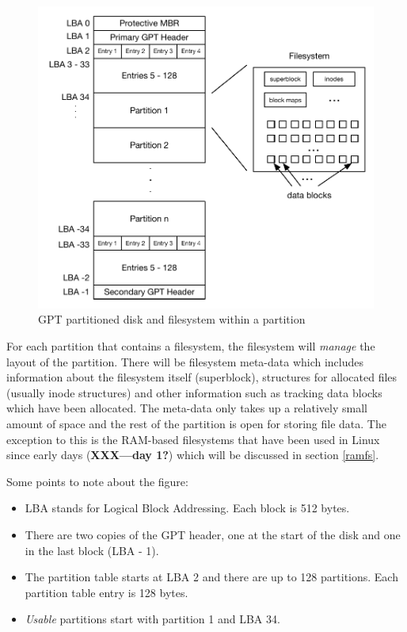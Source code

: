 \begin{figure}
	\includegraphics[scale=0.6]{figures/gpt.pdf}
	\centering
	\caption{GPT partitioned disk and filesystem within a partition}
	\label{fig:gpt}
\end{figure}

For each partition that contains a filesystem, the filesystem will \textit{manage} the layout of the partition. There will be filesystem meta-data which includes information about the filesystem itself (superblock), structures for allocated files (usually inode structures) and other information such as tracking data blocks which have been allocated. The meta-data only takes up a relatively small amount of space and the rest of the partition is open for storing file data. The exception to this is the RAM-based filesystems that have been used in Linux since early days (\textbf{XXX---day 1?}) which will be discussed in section \ref{ramfs}.

Some points to note about the figure:

\begin{itemize}
	\item LBA stands for Logical Block Addressing.  Each block is 512 bytes.
	\item There are two copies of the GPT header, one at the start of the disk and one in the last block (LBA - 1).
	\item The partition table starts at LBA 2 and there are up to 128 partitions. Each partition table entry is 128 bytes.
	\item \textit{Usable} partitions start with partition 1 and LBA 34. 
\end{itemize}

